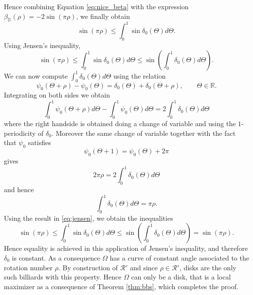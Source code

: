 \documentclass[a4paper]{article}
\theoremstyle{definition}
\def\D{\mathbb{D}}
\def\R{\mathbb{R}}
\begin{document}
Hence combining Equation \eqref{eq:nice_beta} with the expression $\beta_{\D}(\rho)=-2\sin(\pi\rho)$, we finally obtain
\[
    \sin(\pi\rho)\leq \int_0^1\sin\delta_0(\Theta)d\Theta.
\]
Using Jensen's inequality, 
\begin{equation}
\label{eq:jensen}
    \sin(\pi\rho)\leq \int_0^1\sin\delta_0(\Theta)d\Theta \leq \sin\left(\int_0^1\delta_0(\Theta)d\Theta\right).
\end{equation}
We can now compute $\int_0^1\delta_0(\Theta)d\Theta$ using the relation
\[
\psi_0(\Theta+\rho)-\psi_0(\Theta) = \delta_0(\Theta)+\delta_0(\Theta+\rho),
\qquad \Theta\in\R.
\]
Integrating on both sides we obtain
\[
\int_0^1\psi_0(\Theta+\rho)d\Theta-\int_0^1\psi_0(\Theta)d\Theta = 2\int_0^1\delta_0(\Theta)d\Theta 
\]
where the right handside is obtained doing a change of variable and using the $1$-periodicity of $\delta_0$. Moreover the same change of variable together with the fact that $\psi_0$ satisfies
\[
\psi_0(\Theta+1) = \psi_0(\Theta)+2\pi
\]
gives
\[
2\pi\rho = 2\int_0^1\delta_0(\Theta)d\Theta
\]
and hence
\[
\int_0^1\delta_0(\Theta)d\Theta = \pi\rho.
\]
Using the result in \eqref{eq:jensen}, we obtain the inequalities
\[
    \sin(\pi\rho)\leq \int_0^1\sin\delta_0(\Theta)d\Theta \leq \sin\left(\int_0^1\delta_0(\Theta)d\Theta\right) = \sin(\pi\rho).
\]
Hence equality is achieved in this application of Jensen's inequality, and therefore $\delta_0$ is constant. As a consequence $\Omega$ has a curve of constant angle associated to the rotation number $\rho$.
By construction of $\mathscr R'$ and since $\rho\in\mathscr R'$, disks are the only such billiards with this property. Hence $\Omega$ can only be a disk, that is a local maximizer as a consequence of Theorem \ref{thm:bbs}, which completes the proof.
\end{document}
